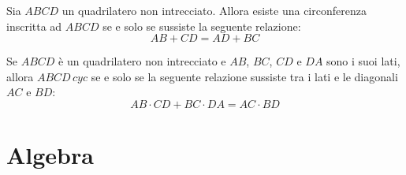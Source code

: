 \documentclass[11pt]{scrartcl}
\begin{document}
	\begin{theorem}[Pitot]
		Sia $ABCD$ un quadrilatero non intrecciato. Allora esiste una circonferenza inscritta ad $ABCD$ se e solo se sussiste la seguente relazione:
		$$AB+CD=AD+BC$$
	\end{theorem}
	\begin{theorem}[Tolomeo]
		Se $ABCD$ è un quadrilatero non intrecciato e $AB$, $BC$, $CD$ e $DA$ sono i suoi lati, allora $ABCD \, cyc$ se e solo se la seguente relazione sussiste tra i lati e le diagonali $AC$ e $BD$:
		$$AB\cdot CD+ BC \cdot DA = AC \cdot BD$$ 
	\end{theorem}

	\newpage
	\section{Algebra}
	
	
\end{document}
